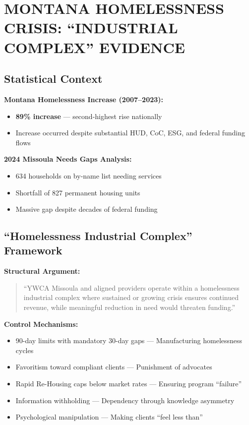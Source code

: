\documentclass[11pt,letterpaper]{article}
\begin{document}
\newpage

\section{MONTANA HOMELESSNESS CRISIS: ``INDUSTRIAL COMPLEX'' EVIDENCE}

\subsection{Statistical Context}

\textbf{Montana Homelessness Increase (2007--2023):}
\begin{itemize}[leftmargin=*]
\item \textbf{89\% increase} --- second-highest rise nationally
\item Increase occurred despite substantial HUD, CoC, ESG, and federal funding flows
\end{itemize}

\textbf{2024 Missoula Needs Gaps Analysis:}
\begin{itemize}[leftmargin=*]
\item 634 households on by-name list needing services
\item Shortfall of 827 permanent housing units
\item Massive gap despite decades of federal funding
\end{itemize}

\subsection{``Homelessness Industrial Complex'' Framework}

\textbf{Structural Argument:}
\begin{quote}
``YWCA Missoula and aligned providers operate within a homelessness industrial complex where sustained or growing crisis ensures continued revenue, while meaningful reduction in need would threaten funding.''
\end{quote}

\textbf{Control Mechanisms:}
\begin{itemize}[leftmargin=*]
\item 90-day limits with mandatory 30-day gaps --- Manufacturing homelessness cycles
\item Favoritism toward compliant clients --- Punishment of advocates
\item Rapid Re-Housing caps below market rates --- Ensuring program ``failure''
\item Information withholding --- Dependency through knowledge asymmetry
\item Psychological manipulation --- Making clients ``feel less than''
\end{itemize}
\end{document}
